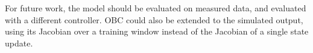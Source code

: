 For future work, the model should be evaluated on measured data, and evaluated with a different controller.
OBC could also be extended to the simulated output, using its Jacobian over a training window instead of the Jacobian of a single state update.
